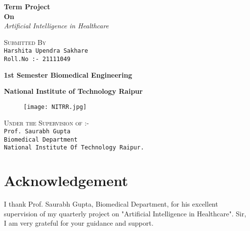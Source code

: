 \documentclass[12pt]{article}
\begin{document}



\begin{center}
\huge {\textbf{Term Project}}\\
\Large {\textbf{On}}\\
\Large {\textit{Artificial Intelligence in Healthcare}}\\
\hspace{2cm}

\large {\textsc{Submitted By}}\\
\large {\texttt{Harshita Upendra Sakhare}}\\
\large {\texttt{Roll.No :- 21111049}}\\
\hspace{2cm}

\large {\textbf{1st Semester Biomedical Engineering}}

\hspace{2cm}


\Large {\textbf{National Institute of Technology Raipur}}
\end{center}


\begin{figure}[h]
\centering
\texttt{[image: NITRR.jpg]}
\end{figure}

\begin{center}
\large {\textsc{Under the Supervision of :-}}\\
\large {\texttt{Prof. Saurabh Gupta}}\\
\large {\texttt{Biomedical Department}}\\
\large {\texttt{National Institute Of Technology Raipur.}}
\end{center}

\clearpage
\tableofcontents
\clearpage

\section{Acknowledgement}

\hspace{1cm}

I thank Prof. Saurabh Gupta, Biomedical Department,  for his excellent supervision of my quarterly project on "Artificial Intelligence in Healthcare". Sir, I am very grateful for your guidance and support. 
 
\end{document}
